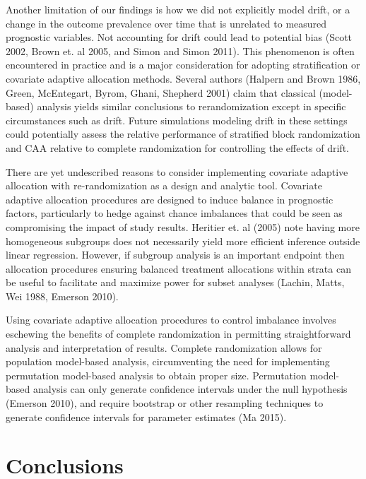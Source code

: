 Another limitation of our findings is how we did not explicitly model drift, or a change in the outcome prevalence over time that is unrelated to measured prognostic variables.
Not accounting for drift could lead to potential bias (Scott 2002, Brown et. al 2005, and Simon and Simon 2011).
This phenomenon is often encountered in practice and is a major consideration for adopting stratification or covariate adaptive allocation methods.
Several authors (Halpern and Brown 1986, Green, McEntegart, Byrom, Ghani, Shepherd 2001) claim that classical (model-based) analysis yields similar conclusions to rerandomization except in specific circumstances such as drift.
Future simulations modeling drift in these settings could potentially assess the relative performance of stratified block randomization and CAA relative to complete randomization for controlling the effects of drift.

There are yet undescribed reasons to consider implementing covariate adaptive allocation with re-randomization as a design and analytic tool.
Covariate adaptive allocation procedures are designed to induce balance in prognostic factors, particularly to hedge against chance imbalances that could be seen as compromising the impact of study results. 
Heritier et. al (2005) note having more homogeneous subgroups does not necessarily yield more efficient inference outside linear regression.
However, if subgroup analysis is an important endpoint then allocation procedures ensuring balanced treatment allocations within strata can be useful to facilitate and maximize power for subset analyses (Lachin, Matts, Wei 1988, Emerson 2010).

Using covariate adaptive allocation procedures to control imbalance involves eschewing the benefits of complete randomization in permitting straightforward analysis and interpretation of results.
Complete randomization allows for population model-based analysis, circumventing the need for implementing permutation model-based analysis to obtain proper size.
Permutation model-based analysis can only generate confidence intervals under the null hypothesis (Emerson 2010), and require bootstrap or other resampling techniques to generate confidence intervals for parameter estimates (Ma 2015).

\section{Conclusions}


